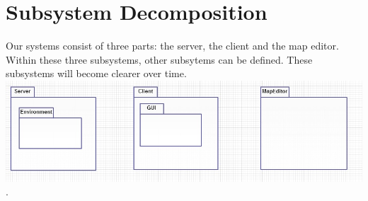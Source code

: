 \section{Subsystem Decomposition}

Our systems consist of three parts: the server, the client and the map editor.  Within these three subsystems, other subsytems can be defined. These subsystems will become clearer over time. \\

\includegraphics[width=\linewidth]{sub.png}.
